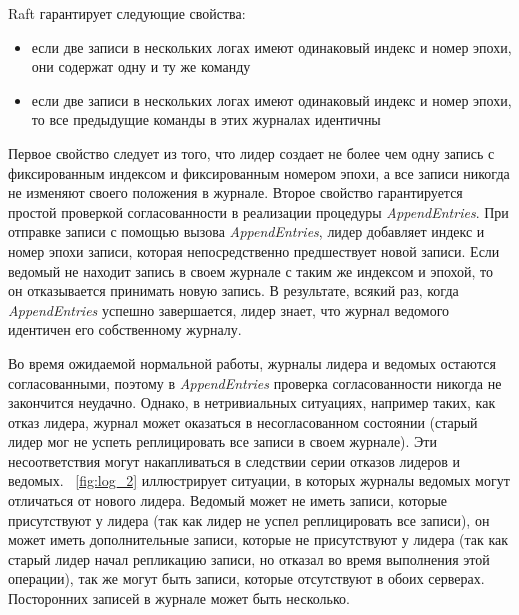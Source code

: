 \documentclass[subf, href, colorlinks=true, 14pt,
times, mtpro, specialist]{disser}
\newcommand{\figref}[1]{\figurename~\ref{#1}}
\theoremstyle{definition}
\begin{document}
Raft гарантирует следующие свойства:
\begin{itemize}
\item если две записи в нескольких логах имеют одинаковый индекс и номер эпохи, они содержат одну и ту же команду
\item если две записи в нескольких логах имеют одинаковый индекс и номер эпохи, то все предыдущие команды в этих журналах идентичны
\end{itemize}

Первое свойство следует из того, что лидер создает не более чем одну запись с фиксированным индексом и фиксированным номером эпохи, а все записи никогда не изменяют своего положения в журнале. Второе свойство гарантируется простой проверкой согласованности в реализации процедуры \textit{AppendEntries}. При отправке записи с помощью вызова \textit{AppendEntries}, лидер добавляет индекс и номер эпохи записи, которая непосредственно предшествует новой записи. Если ведомый не находит запись в своем журнале с таким же индексом и эпохой, то он отказывается принимать новую запись. В результате, всякий раз, когда \textit{AppendEntries} успешно завершается, лидер знает, что журнал ведомого идентичен его собственному журналу.

Во время ожидаемой нормальной работы, журналы лидера и ведомых остаются согласованными, поэтому в \textit{AppendEntries} проверка согласованности никогда не закончится неудачно. Однако, в нетривиальных ситуациях, например таких, как отказ лидера, журнал может оказаться в несогласованном состоянии (старый лидер мог не успеть реплицировать все записи в своем журнале). Эти несоответствия могут накапливаться в следствии серии отказов лидеров и ведомых. \figref{fig:log_2} иллюстрирует ситуации, в которых журналы ведомых могут отличаться от нового лидера. Ведомый может не иметь записи, которые присутствуют у лидера (так как лидер не успел реплицировать все записи), он может иметь дополнительные записи, которые не присутствуют у лидера (так как старый лидер начал репликацию записи, но отказал во время выполнения этой операции), так же могут быть записи, которые отсутствуют в обоих серверах. Посторонних записей в журнале может быть несколько.

\end{document}

